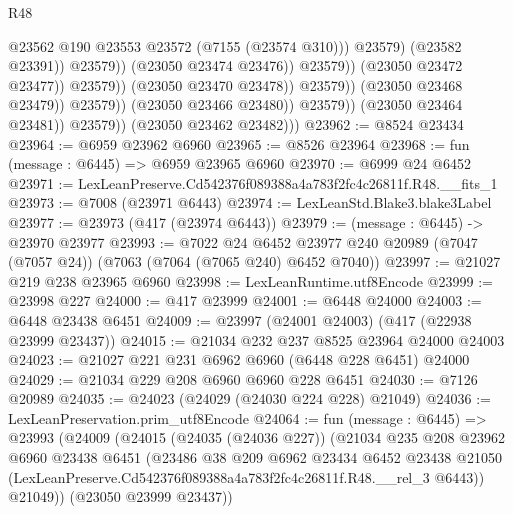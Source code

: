 \begin{lexlean}{R48}
\begin{coremodule}
                                                      @23562
                                                      @190
                                                      @23553
                                                      @23572
                                                      (@7155 (@23574 @310)))
                                                    @23579)
                                                  (@23582 @23391))
                                                @23579))
                                            (@23050 @23474 @23476))
                                          @23579))
                                      (@23050 @23472 @23477))
                                    @23579))
                                (@23050 @23470 @23478))
                              @23579))
                          (@23050 @23468 @23479))
                        @23579))
                    (@23050 @23466 @23480))
                  @23579))
              (@23050 @23464 @23481))
            @23579))
        (@23050 @23462 @23482)))
@23962 := @8524 @23434
@23964 := @6959 @23962 @6960
@23965 := @8526 @23964
@23968 := fun (message : @6445) => @6959 @23965 @6960
@23970 := @6999 @24 @6452
@23971 := LexLeanPreserve.Cd542376f089388a4a783f2fc4c26811f.R48.__fits_1
@23973 := @7008 (@23971 @6443)
@23974 := LexLeanStd.Blake3.blake3Label
@23977 := @23973 (@417 (@23974 @6443))
@23979 := (message : @6445) -> @23970 @23977
@23993 := @7022
    @24
    @6452
    @23977
    @240
    @20989
    (@7047 (@7057 @24))
    (@7063 (@7064 (@7065 @240) @6452 @7040))
@23997 := @21027 @219 @238 @23965 @6960
@23998 := LexLeanRuntime.utf8Encode
@23999 := @23998 @227
@24000 := @417 @23999
@24001 := @6448 @24000
@24003 := @6448 @23438 @6451
@24009 := @23997 (@24001 @24003) (@417 (@22938 @23999 @23437))
@24015 := @21034 @232 @237 @8525 @23964 @24000 @24003
@24023 := @21027 @221 @231 @6962 @6960 (@6448 @228 @6451) @24000
@24029 := @21034 @229 @208 @6960 @6960 @228 @6451
@24030 := @7126 @20989
@24035 := @24023 (@24029 (@24030 @224 @228) @21049)
@24036 := LexLeanPreservation.prim_utf8Encode
@24064 := fun (message : @6445) =>
  @23993
    (@24009
      (@24015
        (@24035 (@24036 @227))
        (@21034
          @235
          @208
          @23962
          @6960
          @23438
          @6451
          (@23486
            @38
            @209
            @6962
            @23434
            @6452
            @23438
            @21050
            (LexLeanPreserve.Cd542376f089388a4a783f2fc4c26811f.R48.__rel_3 @6443))
          @21049))
      (@23050 @23999 @23437))

\end{coremodule}
\end{lexlean}
